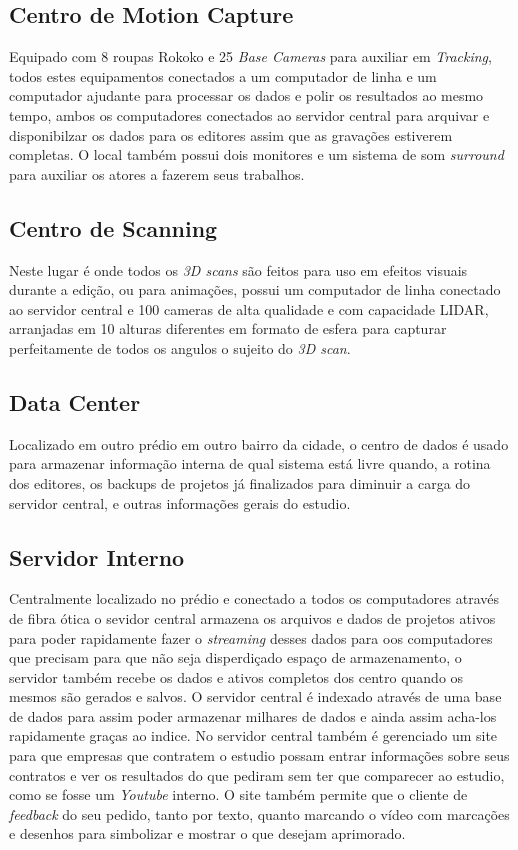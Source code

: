   \subsection{Centro de Motion Capture}
  Equipado com 8 roupas Rokoko e 25 \textit{Base Cameras} para auxiliar em \textit{Tracking}, todos estes equipamentos conectados a um computador de linha e um computador ajudante para processar os dados e polir os resultados ao mesmo tempo, ambos os computadores conectados ao servidor central para arquivar e disponibilzar os dados para os editores assim que as gravações estiverem completas. O local também possui dois monitores e um sistema de som \textit{surround} para auxiliar os atores a fazerem seus trabalhos.
  \subsection{Centro de Scanning}
  Neste lugar é onde todos os \textit{3D scans} são feitos para uso em efeitos visuais durante a edição, ou para animações, possui um computador de linha conectado ao servidor central e 100 cameras de alta qualidade e com capacidade LIDAR, arranjadas em 10 alturas diferentes em formato de esfera para capturar perfeitamente de todos os angulos o sujeito do \textit{3D scan}.
  \subsection{Data Center}
  Localizado em outro prédio em outro bairro da cidade, o centro de dados é usado para armazenar informação interna de qual sistema está livre quando, a rotina dos editores, os backups de projetos já finalizados para diminuir a carga do servidor central, e outras informações gerais do estudio.
  \subsection{Servidor Interno}
  Centralmente localizado no prédio e conectado a todos os computadores através de fibra ótica o sevidor central armazena os arquivos e dados de projetos ativos para poder rapidamente fazer o \textit{streaming} desses dados para oos computadores que precisam para que não seja disperdiçado espaço de armazenamento, o servidor também recebe os dados e ativos completos dos centro quando os mesmos são gerados e salvos. O servidor central é indexado através de uma base de dados para assim poder armazenar milhares de dados e ainda assim acha-los rapidamente graças ao indice. No servidor central também é gerenciado um site para que empresas que contratem o estudio possam entrar informações sobre seus contratos e ver os resultados do que pediram sem ter que comparecer ao estudio, como se fosse um \textit{Youtube} interno. O site também permite que o cliente de \textit{feedback} do seu pedido, tanto por texto, quanto marcando o vídeo com marcações e desenhos para simbolizar e mostrar o que desejam aprimorado.
